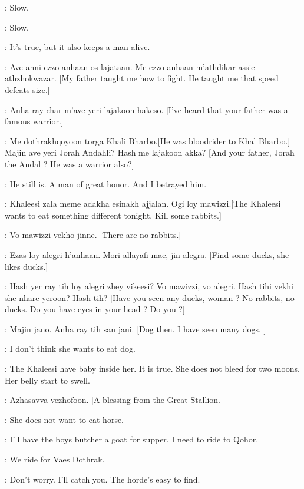 \JORAH: Slow. 

\RAKHARO: Slow. 

\JORAH: It's true, but it also keeps a man alive. 

\RAKHARO: Ave anni ezzo anhaan os lajataan. Me ezzo anhaan m'athdikar assie athzhokwazar. [My father taught me how to fight. He taught me that speed defeats size.]

\JORAH:  Anha ray char m'ave yeri lajakoon hakeso. [I've heard that your father was a famous warrior.]

\RAKHARO: Me dothrakhqoyoon torga Khali Bharbo.[He was bloodrider to Khal Bharbo.] Majin ave yeri Jorah Andahli? Hash me lajakoon akka?  [And your father, Jorah the Andal ? He was a warrior also?]

\JORAH: He still is. A man of great honor. And I betrayed him. 


\IRRI:  Khaleesi zala meme adakha esinakh ajjalan. Ogi loy mawizzi.[The Khaleesi wants to eat something different tonight. Kill some rabbits.]

\RAKHARO: Vo mawizzi vekho jinne. [There are no rabbits.]

\IRRI: Ezas loy alegri h'anhaan. Mori allayafi mae, jin alegra. [Find some ducks, she likes ducks.]

\RAKHARO:  Hash yer ray tih loy alegri zhey vikeesi? Vo mawizzi, vo alegri. Hash tihi vekhi she nhare yeroon? Hash tih? [Have you seen any ducks, woman ? No rabbits, no ducks. Do you have eyes in your head ? Do you ?] 

\IRRI: Majin jano. Anha ray tih san jani. [Dog then. I have seen many dogs. ]

\JORAH: I don't think she wants to eat dog. 

\IRRI: The Khaleesi have baby inside her. It is true. She does not bleed for two moons. Her belly start to swell. 

\RAKHARO: Azhasavva vezhofoon. [A blessing from the Great Stallion. ]

\IRRI: She does not want to eat horse. 

\JORAH: I'll have the boys butcher a goat for supper. I need to ride to Qohor. 

\RAKHARO: We ride for Vaes Dothrak. 

\JORAH: Don't worry. I'll catch you. The horde's easy to find. 

\scene


